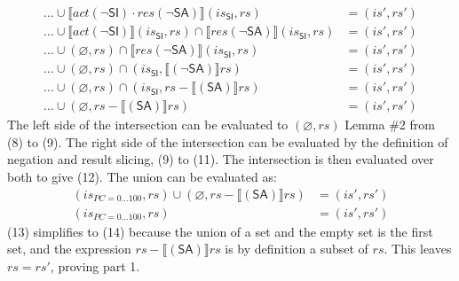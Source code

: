 \documentclass[12pt, letterpaper]{article}
\let\emptyset\varnothing
\begin{document}
\begin{align}
    \ldots \cup %
    \llbracket \mathit{act}(\neg\mathsf{SI}) \cdot
     \mathit{res}(\neg\mathsf{SA}) \rrbracket (\mathit{is_{\mathsf{SI}}}, \mathit{rs})
    &=
    (\mathit{is}', \mathit{rs}')
    \\
    \ldots \cup %
    \llbracket \mathit{act}(\neg\mathsf{SI}) \rrbracket (\mathit{is_{\mathsf{SI}}}, \mathit{rs}) \cap
    \llbracket \mathit{res}(\neg\mathsf{SA}) \rrbracket (\mathit{is_{\mathsf{SI}}}, \mathit{rs})
    &=
    (\mathit{is}', \mathit{rs}')
    \\
    \ldots \cup 
    (\emptyset, \mathit{rs}) \cap
    \llbracket \mathit{res}(\neg\mathsf{SA}) \rrbracket (\mathit{is_{\mathsf{SI}}}, \mathit{rs})
    &=
    (\mathit{is}', \mathit{rs}')
    \\ %
    \ldots \cup 
    (\emptyset, \mathit{rs}) \cap
    (\mathit{is_{\mathsf{SI}}}, \llbracket (\neg\mathsf{SA}) \rrbracket \mathit{rs})
    &=
    (\mathit{is}', \mathit{rs}')
    \\
    \ldots \cup 
    (\emptyset, \mathit{rs}) \cap
    (\mathit{is_{\mathsf{SI}}}, \mathit{rs} - \llbracket (\mathsf{SA}) \rrbracket \mathit{rs})
    &=
    (\mathit{is}', \mathit{rs}') %
    \\
    \ldots \cup 
    (\emptyset, \mathit{rs} - \llbracket (\mathsf{SA}) \rrbracket \mathit{rs})
    &=
    (\mathit{is}', \mathit{rs}')
\end{align}
    The left side of the intersection can be evaluated to $(\emptyset, \mathit{rs})$ Lemma \#2 from (8) to (9). The right side of the intersection can be evaluated by the definition of negation and result slicing, (9) to (11).  The intersection is then evaluated over both to give (12).  The union can be evaluated as:
\begin{align}
    (\mathit{is_{PC=0\ldots100}}, \mathit{rs}) \cup 
    (\emptyset, \mathit{rs} - \llbracket (\mathsf{SA}) \rrbracket \mathit{rs})
    &=
    (\mathit{is}', \mathit{rs}')
    \\
    (\mathit{is_{PC=0\ldots100}}, \mathit{rs})
    &=
    (\mathit{is}', \mathit{rs}')
\end{align} 
    (13) simplifies to (14) because the union of a set and the empty set is the first set, and the expression $\mathit{rs} - \llbracket (\mathsf{SA}) \rrbracket \mathit{rs}$ is by definition a subset of $\mathit{rs}$.  This leaves $\mathit{rs} = \mathit{rs}'$, proving part 1. 
\end{document}
